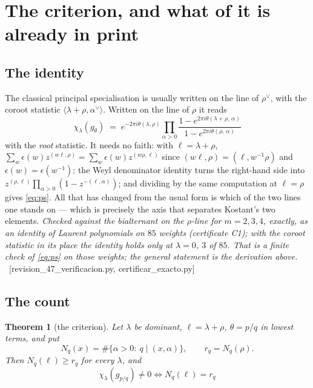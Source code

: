 \documentclass[11pt,a4paper]{article}
\newtheorem{theorem}{Theorem}[section]
\theoremstyle{definition}
\newcommand{\ver}[1]{\unskip\penalty0\ \textcolor{azul}{\small\textsf{[#1]}}}
\begin{document}
\section{The criterion, and what of it is already in print}\label{sec:crit}

\subsection*{The identity}

The classical principal specialisation is usually written on the line of $\rho^\vee$, with the
coroot statistic $\langle\lambda+\rho,\alpha^\vee\rangle$. Written on the line of $\rho$ it reads
\begin{equation}\label{eq:ps}
\boxed{\;\chi_\lambda(g_\theta)\;=\;e^{-2\pi i\theta(\lambda,\rho)}\prod_{\alpha>0}
\frac{1-e^{2\pi i\theta(\lambda+\rho,\,\alpha)}}{1-e^{2\pi i\theta(\rho,\,\alpha)}}\;}
\end{equation}
with the \emph{root} statistic. It needs no faith: with $\ell=\lambda+\rho$,
$\sum_w\epsilon(w)z^{(w\ell,\rho)}=\sum_w\epsilon(w)z^{(w\rho,\ell)}$ since
$(w\ell,\rho)=(\ell,w^{-1}\rho)$ and $\epsilon(w)=\epsilon(w^{-1})$; the Weyl denominator identity
turns the right-hand side into $z^{(\rho,\ell)}\prod_{\alpha>0}(1-z^{-(\ell,\alpha)})$; and dividing
by the same computation at $\ell=\rho$ gives \eqref{eq:ps}. All that has changed from the usual form
is which of the two lines one stands on --- which is precisely the axis that separates Kostant's two
elements. \emph{Checked against the bialternant on the $\rho$-line for $m=2,3,4$, exactly, as an
identity of Laurent polynomials on $85$ weights (certificate C1); with the coroot statistic in its
place the identity holds only at $\lambda=0$, $3$ of $85$. That is a finite check of \eqref{eq:ps} on
those weights; the general statement is the derivation above.}
\ver{revision\_47\_verificacion.py, certificar\_exacto.py}

\subsection*{The count}

\begin{theorem}[the criterion]\label{thm:crit}
Let $\lambda$ be dominant, $\ell=\lambda+\rho$, $\theta=p/q$ in lowest terms, and put
\[
N_q(x)=\#\{\alpha>0:\ q\mid(x,\alpha)\},\qquad r_q=N_q(\rho) .
\]
Then $N_q(\ell)\ge r_q$ for every $\lambda$, and
\begin{equation}\label{eq:crit}
\boxed{\;\chi_\lambda(g_{p/q})\neq0 \iff N_q(\ell)=r_q\;}
\end{equation}
\end{theorem}
\end{document}
